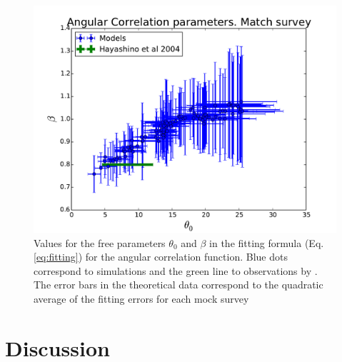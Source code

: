 \documentclass[usenatbib]{mn2e}
\begin{document}
\begin{figure}
\begin{center}
\includegraphics[width=1.0\linewidth,angle=0]{power_law_correlation_degree2.pdf}  
\end{center}
\caption{Values for the free parameters $\theta_{0}$ and $\beta$
in the fitting formula (Eq. \ref{eq:fitting}) for the angular
correlation function. Blue dots correspond to simulations and the
green line to observations by \citet{Ouchi2010}. The error
bars in the theoretical data correspond to the quadratic average of
the fitting errors for each mock
survey \label{fig:correlation_parameters}} 
\end{figure} 


\section{Discussion}
\end{document}
